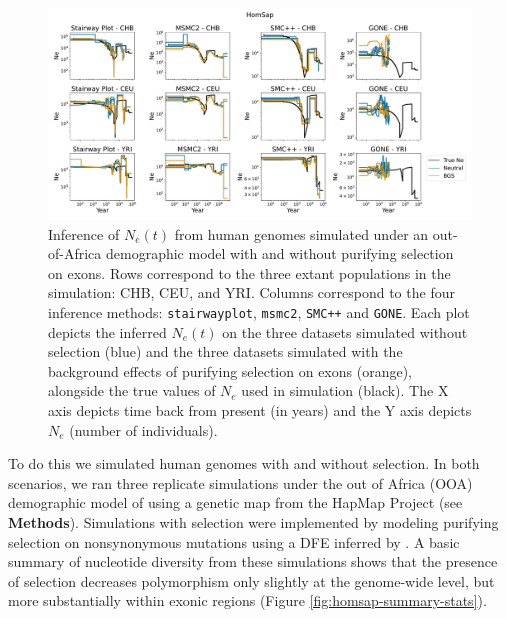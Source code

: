 \documentclass[hidelinks]{article}
\newcommand{\msmc}{\texttt{msmc2}\xspace}
\newcommand{\stairway}{\texttt{stairwayplot}\xspace}
\newcommand{\gone}{\texttt{GONE}\xspace}
\newcommand{\smcpp}{\texttt{SMC++}\xspace}
\begin{document}
    \begin{figure}[b!]
        \centering
        \includegraphics[width=\textwidth]{figures/HomSap/OOA/estimated_Ne_t_final}
        \caption{
        \label{fig:human-demography}
        Inference of $N_e(t)$ from human genomes simulated under an out-of-Africa demographic model
        with and without purifying selection on exons.
        Rows correspond to the three extant populations in the simulation: CHB, CEU, and YRI.
        Columns correspond to the four inference methods:
        \stairway, \msmc, \smcpp and \gone.
        Each plot depicts the inferred $N_e(t)$ on the three datasets simulated without selection (blue)
        and the three datasets simulated with the background effects of purifying selection on exons (orange),
        alongside the true values of $N_e$ used in simulation (black).
        The X axis depicts time back from present (in years) and the Y axis depicts $N_e$ (number of individuals).
        }
    \end{figure}

    To do this we simulated human genomes with and without selection.
    In both scenarios, we ran three replicate simulations
    under the out of Africa (OOA) demographic model of
    \citet{ragsdale2019models} using a genetic map from the HapMap Project \citep{international2007second} (see \textbf{Methods}).
    Simulations with selection were implemented by modeling purifying selection on nonsynonymous mutations
    using a DFE inferred by \citet{kim2017inference}.
    A basic summary of nucleotide diversity from these simulations
    shows that the presence of selection decreases polymorphism only slightly
    at the genome-wide level, but more substantially within exonic regions (Figure \ref{fig:homsap-summary-stats}). 
    
\end{document}
